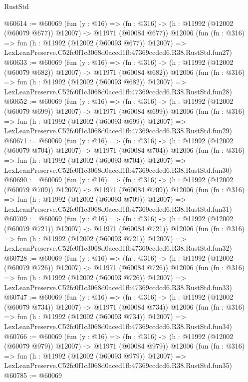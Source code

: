 \begin{lexlean}{RustStd}
\begin{coremodule}
@60614 := @60069
    (fun (y : @16) =>
    (fn : @316) -> (h : @11992 (@12002 (@60079 @677)) @12007) -> @11971 (@60084 @677))
    @12006
    (fun (fn : @316) =>
    fun (h : @11992 (@12002 (@60093 @677)) @12007) =>
    LexLeanPreserve.C52fc0f1c3068d0aced1fb47369ccdcd6.R38.RustStd.fun27)
@60633 := @60069
    (fun (y : @16) =>
    (fn : @316) -> (h : @11992 (@12002 (@60079 @682)) @12007) -> @11971 (@60084 @682))
    @12006
    (fun (fn : @316) =>
    fun (h : @11992 (@12002 (@60093 @682)) @12007) =>
    LexLeanPreserve.C52fc0f1c3068d0aced1fb47369ccdcd6.R38.RustStd.fun28)
@60652 := @60069
    (fun (y : @16) =>
    (fn : @316) -> (h : @11992 (@12002 (@60079 @699)) @12007) -> @11971 (@60084 @699))
    @12006
    (fun (fn : @316) =>
    fun (h : @11992 (@12002 (@60093 @699)) @12007) =>
    LexLeanPreserve.C52fc0f1c3068d0aced1fb47369ccdcd6.R38.RustStd.fun29)
@60671 := @60069
    (fun (y : @16) =>
    (fn : @316) -> (h : @11992 (@12002 (@60079 @704)) @12007) -> @11971 (@60084 @704))
    @12006
    (fun (fn : @316) =>
    fun (h : @11992 (@12002 (@60093 @704)) @12007) =>
    LexLeanPreserve.C52fc0f1c3068d0aced1fb47369ccdcd6.R38.RustStd.fun30)
@60690 := @60069
    (fun (y : @16) =>
    (fn : @316) -> (h : @11992 (@12002 (@60079 @709)) @12007) -> @11971 (@60084 @709))
    @12006
    (fun (fn : @316) =>
    fun (h : @11992 (@12002 (@60093 @709)) @12007) =>
    LexLeanPreserve.C52fc0f1c3068d0aced1fb47369ccdcd6.R38.RustStd.fun31)
@60709 := @60069
    (fun (y : @16) =>
    (fn : @316) -> (h : @11992 (@12002 (@60079 @721)) @12007) -> @11971 (@60084 @721))
    @12006
    (fun (fn : @316) =>
    fun (h : @11992 (@12002 (@60093 @721)) @12007) =>
    LexLeanPreserve.C52fc0f1c3068d0aced1fb47369ccdcd6.R38.RustStd.fun32)
@60728 := @60069
    (fun (y : @16) =>
    (fn : @316) -> (h : @11992 (@12002 (@60079 @726)) @12007) -> @11971 (@60084 @726))
    @12006
    (fun (fn : @316) =>
    fun (h : @11992 (@12002 (@60093 @726)) @12007) =>
    LexLeanPreserve.C52fc0f1c3068d0aced1fb47369ccdcd6.R38.RustStd.fun33)
@60747 := @60069
    (fun (y : @16) =>
    (fn : @316) -> (h : @11992 (@12002 (@60079 @734)) @12007) -> @11971 (@60084 @734))
    @12006
    (fun (fn : @316) =>
    fun (h : @11992 (@12002 (@60093 @734)) @12007) =>
    LexLeanPreserve.C52fc0f1c3068d0aced1fb47369ccdcd6.R38.RustStd.fun34)
@60766 := @60069
    (fun (y : @16) =>
    (fn : @316) -> (h : @11992 (@12002 (@60079 @979)) @12007) -> @11971 (@60084 @979))
    @12006
    (fun (fn : @316) =>
    fun (h : @11992 (@12002 (@60093 @979)) @12007) =>
    LexLeanPreserve.C52fc0f1c3068d0aced1fb47369ccdcd6.R38.RustStd.fun35)
@60785 := @60069

\end{coremodule}
\end{lexlean}
